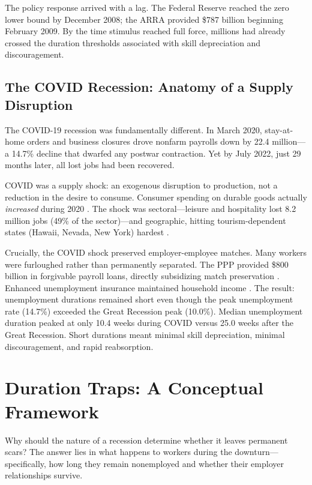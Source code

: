\documentclass[12pt]{article}
\begin{document}
The policy response arrived with a lag. The Federal Reserve reached the zero lower bound by December 2008; the ARRA provided \$787 billion beginning February 2009. By the time stimulus reached full force, millions had already crossed the duration thresholds associated with skill depreciation and discouragement.

\subsection{The COVID Recession: Anatomy of a Supply Disruption}

The COVID-19 recession was fundamentally different. In March 2020, stay-at-home orders and business closures drove nonfarm payrolls down by 22.4 million---a 14.7\% decline that dwarfed any postwar contraction. Yet by July 2022, just 29 months later, all lost jobs had been recovered.

COVID was a supply shock: an exogenous disruption to production, not a reduction in the desire to consume. Consumer spending on durable goods actually \textit{increased} during 2020 \citep{guerrieri2022macroeconomic}. The shock was sectoral---leisure and hospitality lost 8.2 million jobs (49\% of the sector)---and geographic, hitting tourism-dependent states (Hawaii, Nevada, New York) hardest \citep{cajner2020us}.

Crucially, the COVID shock preserved employer-employee matches. Many workers were furloughed rather than permanently separated. The PPP provided \$800 billion in forgivable payroll loans, directly subsidizing match preservation \citep{autor2022paycheck}. Enhanced unemployment insurance maintained household income \citep{ganong2020us}. The result: unemployment durations remained short even though the peak unemployment rate (14.7\%) exceeded the Great Recession peak (10.0\%). Median unemployment duration peaked at only 10.4 weeks during COVID versus 25.0 weeks after the Great Recession. Short durations meant minimal skill depreciation, minimal discouragement, and rapid reabsorption.


\section{Duration Traps: A Conceptual Framework}
\label{sec:framework}

Why should the nature of a recession determine whether it leaves permanent scars? The answer lies in what happens to workers during the downturn---specifically, how long they remain nonemployed and whether their employer relationships survive.
\end{document}
